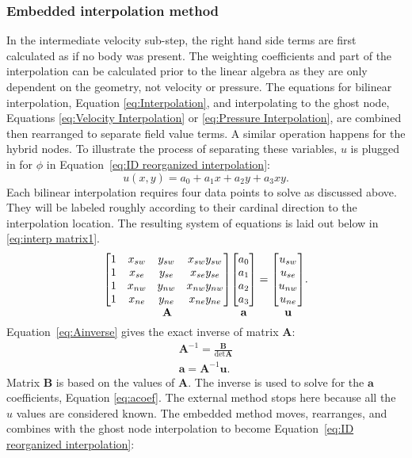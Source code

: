 \documentclass[preprint,12pt,5p]{elsarticle}
\newcommand*{\putunder}[2]{%
	{\mathop{#1}_{\textstyle #2}}%
}
\begin{document}
\subsubsection{Embedded interpolation method}
\label{sec:ID embedded}
In the intermediate velocity sub-step, the right hand side terms are first calculated as if no body was present. 
The weighting coefficients and part of the interpolation can be calculated prior to the linear algebra as they are only dependent on the geometry, not velocity or pressure. 
The equations for bilinear interpolation, Equation \eqref{eq:Interpolation}, and interpolating to the ghost node, Equations \eqref{eq:Velocity Interpolation} or \eqref{eq:Pressure Interpolation}, are combined then rearranged to separate field value terms. 
A similar operation happens for the hybrid nodes. 
To illustrate the process of separating these variables, $u$ is plugged in for $\phi$ in Equation~\eqref{eq:ID reorganized interpolation}:
\begin{equation}
u(x,y) = a_0 + a_1x +a_2y+a_3xy.
\end{equation}
Each bilinear interpolation requires four data points to solve as discussed above.  
They will be labeled roughly according to their cardinal direction to the interpolation location. 
The resulting system of equations is laid out below in \eqref{eq:interp matrix1}.
\begin{gather}
\putunder{
	\begin{bmatrix}
	1&x_{sw}&y_{sw}&x_{sw}y_{sw}\\
	1&x_{se}&y_{se}&x_{se}y_{se}\\
	1&x_{nw}&y_{nw}&x_{nw}y_{nw}\\
	1&x_{ne}&y_{ne}&x_{ne}y_{ne}
	\end{bmatrix}
}{\textbf{A}}
\putunder{
	\begin{bmatrix}
	a_0\\
	a_1\\
	a_2\\
	a_3
	\end{bmatrix}
}{\textbf{a}\vphantom{A}}
=
\putunder{
	\begin{bmatrix}
	u_{sw}\\
	u_{se}\\
	u_{nw}\\
	u_{ne}
	\end{bmatrix}
}{\textbf{u}\vphantom{A}}.
\label{eq:interp matrix2}
\end{gather}
Equation~\eqref{eq:Ainverse} gives the exact inverse of matrix $\textbf{A}$:
\begin{align}
\textbf{A}^{-1} = \frac{\textbf{B}}{\det{\textbf{A}}}
\label{eq:Ainverse}\\
\textbf{a}=\textbf{A}^{-1}\textbf{u}.\;\label{eq:acoef}
\end{align}
Matrix $\textbf{B}$ is based on the values of $\textbf{A}$. 
The inverse is used to solve for the $\textbf{a}$ coefficients, Equation \eqref{eq:acoef}.
The external method stops here because all the $u$ values are considered known. 
The embedded method moves, rearranges, and combines with the ghost node interpolation to become Equation~\eqref{eq:ID reorganized interpolation}:
\end{document}
